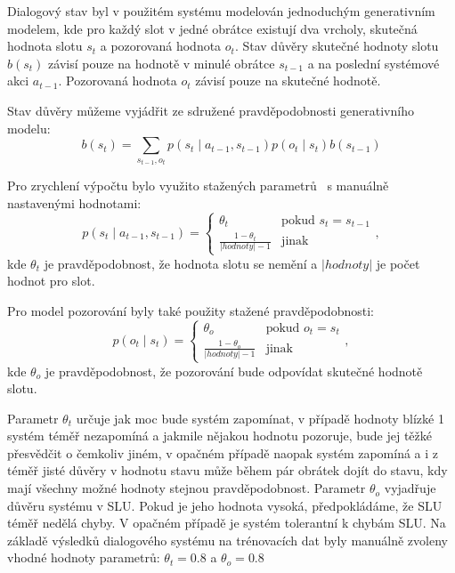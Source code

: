 Dialogový stav byl v použitém systému modelován jednoduchým generativním modelem, kde pro každý slot v jedné obrátce existují dva vrcholy, skutečná hodnota slotu $s_t$ a pozorovaná hodnota $o_t$.  
Stav důvěry skutečné hodnoty slotu $b(s_t)$ závisí pouze na hodnotě v minulé obrátce $s_{t-1}$ a na poslední systémové akci $a_{t-1}$.
Pozorovaná hodnota $o_t$ závisí pouze na skutečné hodnotě.

Stav důvěry můžeme vyjádřit ze sdružené pravděpodobnosti generativního modelu:
\begin{equation}
b(s_t) = \sum_{s_{t-1}, o_t} p(s_t \mid a_{t-1}, s_{t-1}) p(o_t \mid s_t) b(s_{t-1})
\end{equation}

Pro zrychlení výpočtu bylo využito stažených parametrů~\cite{thomson2010bayesian} s manuálně nastavenými hodnotami:
\begin{equation}
p(s_t \mid a_{t-1}, s_{t-1}) = \begin{cases}
\theta_t & \text{pokud } s_t = s_{t-1} \\
\frac{1 - \theta_t}{|hodnoty| - 1} & \text{jinak}
\end{cases},
\end{equation}
kde $\theta_t$ je pravděpodobnost, že hodnota slotu se nemění a $|hodnoty|$ je počet hodnot pro slot.

Pro model pozorování byly také použity stažené pravděpodobnosti:
\begin{equation}
p(o_t \mid s_t) = \begin{cases}
\theta_o & \text{pokud } o_t = s_t \\
\frac{1 - \theta_o}{|hodnoty| - 1} & \text{jinak}
\end{cases},
\end{equation}
kde $\theta_o$ je pravděpodobnost, že pozorování bude odpovídat skutečné hodnotě slotu.

Parametr $\theta_t$ určuje jak moc bude systém zapomínat, v případě hodnoty blízké 1 systém téměř nezapomíná a jakmile nějakou hodnotu pozoruje, bude jej těžké přesvědčit o čemkoliv jiném, v opačném případě naopak systém zapomíná a i z téměř jisté důvěry v hodnotu stavu může během pár obrátek dojít do stavu, kdy mají všechny možné hodnoty stejnou pravděpodobnost.
Parametr $\theta_o$ vyjadřuje důvěru systému v SLU.
Pokud je jeho hodnota vysoká, předpokládáme, že SLU téměř nedělá chyby.
V opačném případě je systém tolerantní k chybám SLU.
Na základě výsledků dialogového systému na trénovacích dat byly manuálně zvoleny vhodné hodnoty parametrů: $\theta_t = 0.8$ a $\theta_o = 0.8$

